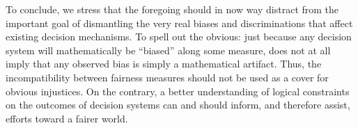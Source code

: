\documentclass[twocolumn]{article}
\begin{document}
To conclude, we stress that the foregoing should in now way distract from the
important goal of dismantling the very real biases and discriminations that affect
existing decision mechanisms. To spell out the obvious: just because any
decision system will mathematically be ``biased'' along some measure, does not
at all imply that any observed bias is simply a mathematical artifact. Thus, the incompatibility between fairness measures should not be used as a cover for obvious injustices. On the contrary, a better
understanding of logical constraints on the outcomes of decision systems can and should
inform, and therefore assist, efforts toward a fairer world. 



{}

\end{document}
